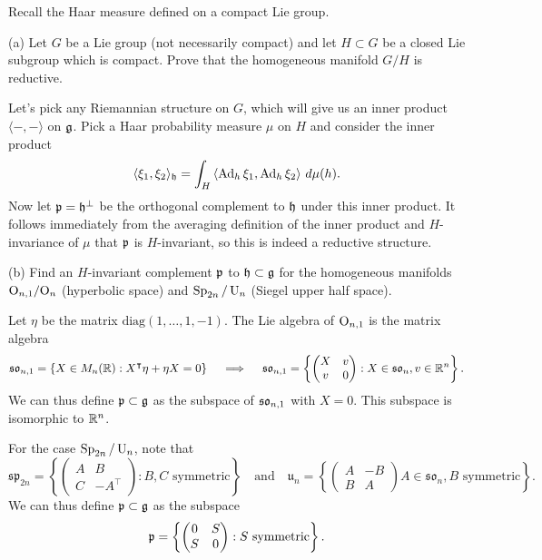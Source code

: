 \documentclass{../../templates/lkx_pset}
\begin{document}
\pagebreak
\begin{problem}{2}
  Recall the Haar measure defined on a compact Lie group.
\end{problem}
\begin{parts}
  \begin{part}{(a)}
    Let $G$ be a Lie group (not necessarily compact) and let $H\subset G$ be a closed Lie subgroup which is compact. Prove that the homogeneous manifold $G/H$ is reductive.
  \end{part}

  Let's pick any Riemannian structure on $G$, which will give us an inner product $\langle -, -\rangle$ on $\mathfrak{g}$. Pick a Haar probability measure $\mu$ on $H$ and consider the inner product
  \[
    \langle \xi_1, \xi_2 \rangle_{\mathfrak{h}} = \int_H \left\langle \operatorname{Ad}_h \xi_1, \operatorname{Ad}_h \xi_2\right\rangle\,d\mu(h).
  \]
  Now let $\mathfrak{p}=\mathfrak{h}^\perp$ be the orthogonal complement to $\mathfrak{h}$ under this inner product. 
  It follows immediately from the averaging definition of the inner product and $H$-invariance of $\mu$ that $\mathfrak{p}$ is $H$-invariant, so this is indeed a reductive structure.

  \begin{part}{(b)}
    Find an $H$-invariant complement $\mathfrak{p}$ to $\mathfrak{h}\subset \mathfrak{g}$ for the homogeneous manifolds ${\operatorname{O}}_{n,1} / {\operatorname{O}}_n$ (hyperbolic space) 
    and $\operatorname{Sp}_{2n} / \operatorname{U}_n$ (Siegel upper half space).
  \end{part}

  Let $\eta$ be the matrix $\textrm{diag}(1,\ldots, 1,-1)$. The Lie algebra of ${\operatorname{O}}_{n,1}$ is the matrix algebra
  \[
    \mathfrak{so}_{n,1} = \{ X\in M_n(\mathbb{R}) : X^\intercal \eta + \eta X = 0\}\quad\implies\quad \mathfrak{so}_{n,1} = \left\{\begin{pmatrix}X & v \\ v & 0\end{pmatrix} : X\in \mathfrak{so}_n,  v\in \mathbb{R}^n\right\}.
  \]
  We can thus define $\mathfrak{p}\subset \mathfrak{g}$ as the subspace of $\mathfrak{so}_{n,1}$ with $X=0$. This subspace is isomorphic to $\mathbb{R}^n$.

  For the case $\operatorname{Sp}_{2n} /\operatorname{U}_n$, note that
  \[
    \mathfrak{sp}_{2n} = \left\{\begin{pmatrix}A&B\\ C&-A^\intercal\end{pmatrix} : B,C \textrm{ symmetric}\right\}\quad\textrm{and}\quad \mathfrak{u}_n = \left\{\begin{pmatrix} A & -B \\ B & A\end{pmatrix} A \in \mathfrak{so}_n, B\textrm{ symmetric}\right\}.
  \]
  We can thus define $\mathfrak{p}\subset \mathfrak{g}$ as the subspace
  \[
    \mathfrak{p} = \left\{ \begin{pmatrix} 0 & S \\ S & 0\end{pmatrix} : S \textrm{ symmetric}\right\}.
  \]
  

\end{parts}
\end{document}
